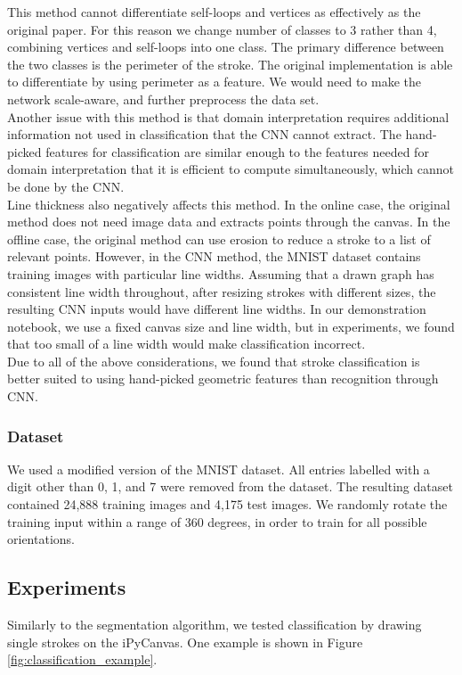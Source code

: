 This method cannot differentiate self-loops and vertices as effectively as the original paper. For this reason we change number of classes to 3 rather than 4, combining vertices and self-loops into one class. The primary difference between the two classes is the perimeter of the stroke. The original implementation is able to differentiate by using perimeter as a feature. We would need to make the network scale-aware, and further preprocess the data set. \\

Another issue with this method is that domain interpretation requires additional information not used in classification that the CNN cannot extract. The hand-picked features for classification are similar enough to the features needed for domain interpretation that it is efficient to compute simultaneously, which cannot be done by the CNN. \\

Line thickness also negatively affects this method. In the online case, the original method does not need image data and extracts points through the canvas. In the offline case, the original method can use erosion to reduce a stroke to a list of relevant points. However, in the CNN method, the MNIST dataset contains training images with particular line widths. Assuming that a drawn graph has consistent line width throughout, after resizing strokes with different sizes, the resulting CNN inputs would have different line widths. In our demonstration notebook, we use a fixed canvas size and line width, but in experiments, we found that too small of a line width would make classification incorrect. \\

Due to all of the above considerations, we found that stroke classification is better suited to using hand-picked geometric features than recognition through CNN.

\subsubsection{Dataset}

We used a modified version of the MNIST dataset. All entries labelled with a digit other than 0, 1, and 7 were removed from the dataset. The resulting dataset contained 24,888 training images and 4,175 test images. We randomly rotate the training input within a range of 360 degrees, in order to train for all possible orientations.

\subsection{Experiments}
Similarly to the segmentation algorithm, we tested classification by drawing single strokes on the iPyCanvas. One example is shown in Figure \ref{fig:classification_example}.

